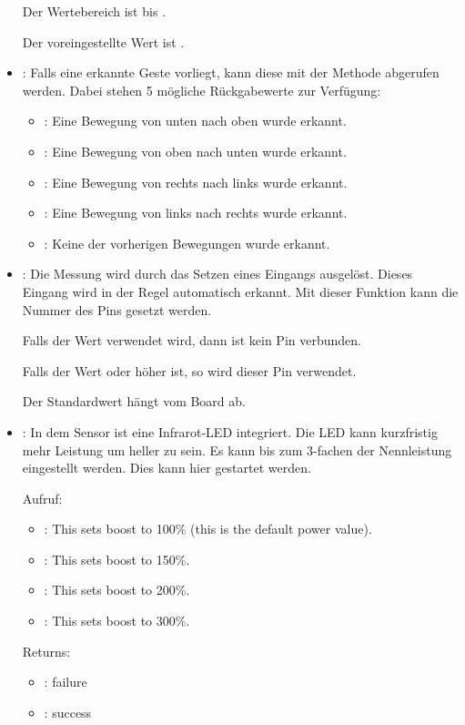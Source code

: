 \begin{itemize}
        Der Wertebereich ist  bis .
  
        Der voreingestellte Wert ist .
        
  \item {}: Falls eine erkannte Geste vorliegt, kann diese mit der Methode  abgerufen werden. Dabei stehen 5 mögliche Rückgabewerte zur Verfügung:
  
       \begin{itemize}
         \item {}: Eine Bewegung von unten nach oben wurde erkannt.
         \item {}: Eine Bewegung von oben nach unten wurde erkannt.
         \item {}: Eine Bewegung von rechts nach links wurde erkannt.
         \item {}: Eine Bewegung von links nach rechts wurde erkannt.
         \item {}: Keine der vorherigen Bewegungen wurde erkannt. 
      \end{itemize}
      
  \item {}: Die Messung wird durch das Setzen eines Eingangs ausgelöst. Dieses Eingang wird in der Regel automatisch erkannt. Mit dieser Funktion kann die Nummer des Pins gesetzt werden.
  
        Falls der Wert  verwendet wird, dann ist kein Pin verbunden.
  
        Falls der Wert  oder höher ist, so wird dieser Pin verwendet.
  
        Der Standardwert hängt vom Board ab.
  
  \item {}: In dem Sensor ist eine Infrarot-LED integriert. Die LED kann kurzfristig mehr Leistung um heller zu sein. Es kann bis zum 3-fachen der Nennleistung eingestellt werden. Dies kann hier gestartet werden.

    \medskip
    
    Aufruf:
    
    \begin{itemize}
      \item {}: This sets boost to 100\% (this is the default power value).
      \item {}: This sets boost to 150\%. 
      \item {}: This sets boost to 200\%.
      \item {}: This sets boost to 300\%.
    \end{itemize}    
    
    \medskip
    
    Returns:
     
    \begin{itemize}
      \item {}: failure
      \item {}: success
    \end{itemize}
\end{itemize}
  
